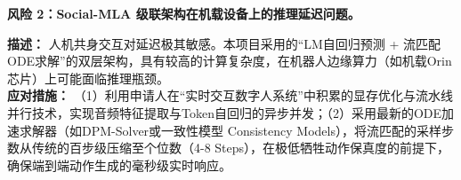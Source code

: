{\textbf{风险 2：Social-MLA 级联架构在机载设备上的推理延迟问题。}}

\textbf{描述：} 人机共身交互对延迟极其敏感。本项目采用的“LM自回归预测 + 流匹配ODE求解”的双层架构，具有较高的计算复杂度，在机器人边缘算力（如机载Orin芯片）上可能面临推理瓶颈。\\
\textbf{应对措施：} （1）利用申请人在“实时交互数字人系统”中积累的显存优化与流水线并行技术，实现音频特征提取与Token自回归的异步并发；（2）采用最新的ODE加速求解器（如DPM-Solver或一致性模型 Consistency Models），将流匹配的采样步数从传统的百步级压缩至个位数（4-8 Steps），在极低牺牲动作保真度的前提下，确保端到端动作生成的毫秒级实时响应。

